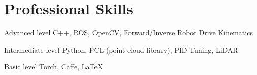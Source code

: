 \documentclass{tccv}
\begin{document}
\section{Professional Skills}
\begin{factlist}

\item{Advanced  level}
     {C++, ROS, OpenCV, Forward/Inverse Robot Drive Kinematics}

\item{Intermediate level}
     {Python, PCL (point cloud library), PID Tuning, LiDAR}

\item{Basic level}
     {Torch, Caffe, \LaTeX}

\end{factlist}
\end{document}
